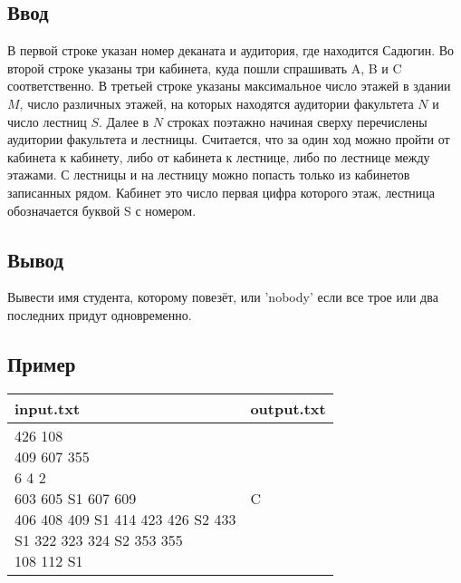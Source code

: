 \documentclass[12pt, oneside]{article}
\begin{document}
\subsection*{Ввод}

В первой строке указан номер деканата и аудитория, где находится Садюгин.
Во второй строке указаны три кабинета, куда пошли спрашивать A, B и C соответственно. 
В третьей строке указаны максимальное число этажей в здании $ M $, число различных этажей, на которых находятся аудитории 
факультета $ N $ и число лестниц $ S $. Далее в $ N $ строках поэтажно начиная сверху перечислены 
аудитории факультета и лестницы. Считается, что за один ход можно пройти от кабинета к кабинету, либо от кабинета к лестнице, 
либо по лестнице между этажами. С лестницы и на лестницу можно попасть только из кабинетов записанных рядом. Кабинет
это число первая цифра которого этаж, лестница обозначается буквой S с номером.

\subsection*{Вывод}

Вывести имя студента, которому повезёт, или 'nobody' если все трое или два последних придут одновременно.

\subsection*{Пример}

\begin{tabular}{|p{}|p{}|}
\hline
input.txt &output.txt \\\hline
\makecell[tl]{426 108\\409 607 355\\6 4 2\\603 605 S1 607 609\\406 408 409 S1 414 423 426 S2 433\\
S1 322 323 324 S2 353 355\\108 112 S1}
&C\\\hline
\end{tabular}
\end{document}
